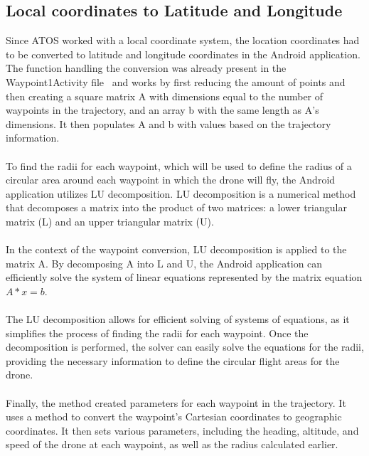\subsection{Local coordinates to Latitude and Longitude}
Since ATOS worked with a local coordinate system, the location coordinates had to be converted to latitude and longitude coordinates in the Android application. The function handling the conversion was already present in the Waypoint1Activity file~\cite{azGithubMobil} and works by first reducing the amount of points and then creating a square matrix A with dimensions equal to the number of waypoints in the trajectory, and an array b with the same length as A's dimensions. It then populates A and b with values based on the trajectory information.
\\ \\
To find the radii for each waypoint, which will be used to define the radius of a circular area around each waypoint in which the drone will fly, the Android application utilizes LU decomposition. LU decomposition is a numerical method that decomposes a matrix into the product of two matrices: a lower triangular matrix (L) and an upper triangular matrix (U).
\\ \\
In the context of the waypoint conversion, LU decomposition is applied to the matrix A. By decomposing A into L and U, the Android application can efficiently solve the system of linear equations represented by the matrix equation $A * x = b$.
\\ \\
The LU decomposition allows for efficient solving of systems of equations, as it simplifies the process of finding the radii for each waypoint. Once the decomposition is performed, the solver can easily solve the equations for the radii, providing the necessary information to define the circular flight areas for the drone.
\\ \\
Finally, the method created parameters for each waypoint in the trajectory. It uses a method to convert the waypoint's Cartesian coordinates to geographic coordinates. It then sets various parameters, including the heading, altitude, and speed of the drone at each waypoint, as well as the radius calculated earlier.

